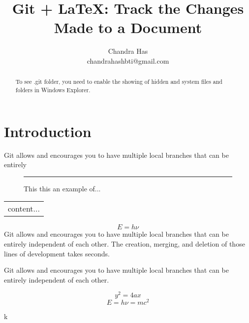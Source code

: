 \documentclass[a4paper,12pt]{article}
\title{Git + \LaTeX: Track the Changes Made to a Document}
\author{Chandra Has\\ \small chandrahashbti@gmail.com}\date{}
\begin{document}
\maketitle	

\begin{abstract}
To see .git folder, you need to enable the showing of hidden and system files and folders in Windows Explorer.
\end{abstract}

\section{Introduction}
Git allows and encourages you to have multiple local branches that can be entirely 

\begin{figure}[!h]\centering\rule{3cm}{3cm}
	\caption{This this an example of...}
\end{figure}

\begin{tabular}{c}
	content...
\end{tabular}


\begin{equation}E=h\nu\end{equation}
Git allows and encourages you to have multiple local branches that can be entirely independent of each other. The creation, merging, and deletion of those lines of development takes seconds.

Git allows and encourages you to have multiple local branches that can be entirely independent of each other. 

$$y^2=4ax$$
$$E=h\nu=mc^2$$

k
\end{document}
